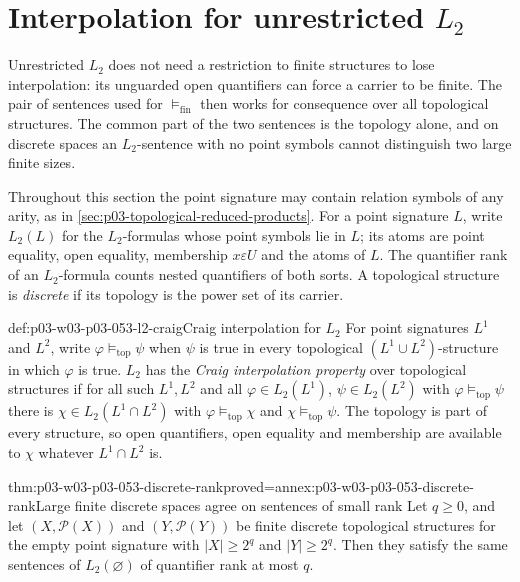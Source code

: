\section{Interpolation for unrestricted \texorpdfstring{\(L_2\)}{L2}}
\label{sec:p03-w03-p03-053-l2-interpolation}

Unrestricted \(L_2\) does not need a restriction to finite structures to
lose interpolation: its unguarded open quantifiers can force a carrier to
be finite. The pair of sentences used for \(\models_{\mathrm{fin}}\) then
works for consequence over all topological structures. The common part of
the two sentences is the topology alone, and on discrete spaces an
\(L_2\)-sentence with no point symbols cannot distinguish two large finite
sizes.

Throughout this section the point signature may contain relation symbols
of any arity, as in \cref{sec:p03-topological-reduced-products}. For a
point signature \(L\), write \(L_2(L)\) for the \(L_2\)-formulas whose
point symbols lie in \(L\); its atoms are point equality, open equality,
membership \(x\varepsilon U\) and the atoms of \(L\). The quantifier rank
of an \(L_2\)-formula counts nested quantifiers of both sorts. A
topological structure is \emph{discrete} if its topology is the power set
of its carrier.

\begin{hbdefinition}{def:p03-w03-p03-053-l2-craig}{Craig interpolation for \texorpdfstring{\(L_2\)}{L2}}
For point signatures \(L^1\) and \(L^2\), write
\(\varphi\models_{\mathrm{top}}\psi\) when \(\psi\) is true in every
topological \((L^1\cup L^2)\)-structure in which \(\varphi\) is true.
\(L_2\) has the \emph{Craig interpolation property} over topological
structures if for all such \(L^1,L^2\) and all \(\varphi\in L_2(L^1)\),
\(\psi\in L_2(L^2)\) with \(\varphi\models_{\mathrm{top}}\psi\) there is
\(\chi\in L_2(L^1\cap L^2)\) with \(\varphi\models_{\mathrm{top}}\chi\) and
\(\chi\models_{\mathrm{top}}\psi\). The topology is part of every
structure, so open quantifiers, open equality and membership are
available to \(\chi\) whatever \(L^1\cap L^2\) is.
\end{hbdefinition}

\begin{hblemma}{thm:p03-w03-p03-053-discrete-rank}{proved=annex:p03-w03-p03-053-discrete-rank}{Large finite discrete spaces agree on sentences of small rank}
Let \(q\ge0\), and let \((X,\mathcal P(X))\) and \((Y,\mathcal P(Y))\) be
finite discrete topological structures for the empty point signature with
\(|X|\ge2^q\) and \(|Y|\ge2^q\). Then they satisfy the same sentences of
\(L_2(\varnothing)\) of quantifier rank at most \(q\).
\end{hblemma}

